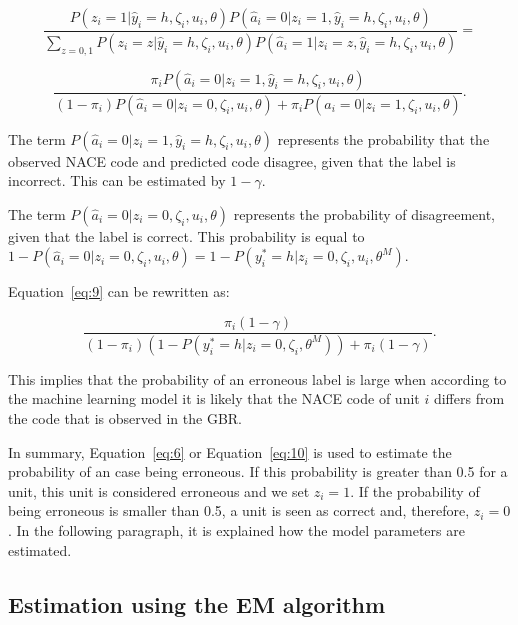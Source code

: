 \documentclass[12pt, a4paper, titlepage]{article}
\begin{document}
						\begin{equation}\label{eq:8}
\frac{P(z_i = 1|\hat{y}_i = h, \zeta_i, u_i, \theta) P(\hat{a}_i=0|z_i=1, \hat{y}_i = h, \zeta_i, u_i, \theta) }
{\sum_{z=0,1}P(z_i=z|\hat{y}_i = h, \zeta_i, u_i, \theta) P( \hat{a}_i=1|z_i=z, \hat{y}_i = h, \zeta_i, u_i, \theta  )} =
						\end{equation}

						\begin{equation}\label{eq:9}
\frac{\pi_i P(\hat{a}_i=0|z_i=1, \hat{y}_i = h, \zeta_i, u_i, \theta) }
{(1-\pi_i)P(\hat{a}_i = 0 | z_i = 0, \zeta_i, u_i, \theta) + \pi_i P(\hat{a}_i = 0 | z_i = 1, \zeta_i, u_i, \theta) } .
						\end{equation}

The term $P(\hat{a}_i= 0|z_i = 1, \hat{y}_i = h, \zeta_i, u_i, \theta)$ represents the probability that the observed NACE code and predicted code disagree, given that the label is incorrect. This can be estimated by $1-\gamma$.

The term $P(\hat{a}_i = 0 | z_i = 0, \zeta_i, u_i, \theta)$ represents the probability of disagreement, given that the label is correct. This probability is equal to $1 - P(\hat{a}_i = 0 | z_i = 0, \zeta_i, u_i, \theta) = 1 - P(y^*_i = h | z_i = 0, \zeta_i, u_i, \theta^M)$. 

Equation~\ref{eq:9} can be rewritten as:

						\begin{equation}\label{eq:10}
\frac{\pi_i (1-\gamma)}{(1-\pi_i)(1-P(y^*_i = h | z_i = 0, \zeta_i, \theta^M)) + \pi_i (1-\gamma)}   .
						\end{equation}


This implies that the probability of an erroneous label is large when according to the machine learning model it is likely that the NACE code of unit $i$ differs from the code that is observed in the GBR.

In summary, Equation~\ref{eq:6} or Equation~\ref{eq:10} is used to estimate the probability of an case being erroneous. If this probability is greater than 0.5 for a unit, this unit is considered erroneous and we set $z_i = 1$. If the probability of being erroneous is smaller than 0.5, a unit is seen as correct and, therefore, $z_i=0$. In the following paragraph, it is explained how the model parameters are estimated.


					\subsection{Estimation using the EM algorithm}
					\label{section:em}
\end{document}
